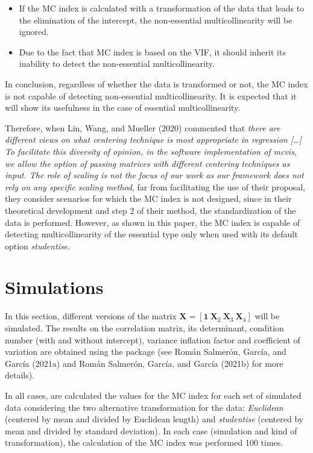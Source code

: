 \begin{itemize}
\tightlist
\item
  If the MC index is calculated with a transformation of the data that leads to the elimination of the intercept, the non-essential multicollinearity will be ignored.
\item
  Due to the fact that MC index is based on the VIF, it should inherit its inability to detect the non-essential multicollinearity.
\end{itemize}

In conclusion, regardless of whether the data is transformed or not, the MC index is not capable of detecting non-essential multicollinearity. It is expected that it will show its usefulness in the case of essential multicollinearity.

Therefore, when Lin, Wang, and Mueller (2020) commented that \emph{there are different views on what centering technique is most appropriate in regression {[}\ldots{]} To facilitate this diversity of opinion, in the software implementation of mcvis, we allow the option of passing matrices with different centering techniques as input. The role of scaling is not the focus of our work as our framework does not rely on any specific scaling method}, far from facilitating the use of their proposal, they consider scenarios for which the MC index is not designed, since in their theoretical development and step 2 of their method, the standardization of the data is performed. However, as shown in this paper, the MC index is capable of detecting multicollinearity of the essential type only when used with its default option \emph{studentise}.

\hypertarget{simulations}{%
\section{Simulations}\label{simulations}}

In this section, different versions of the matrix \(\mathbf{X} = [\mathbf{1} \ \mathbf{X}_{2} \ \mathbf{X}_{3} \ \mathbf{X}_{4}]\) will be simulated. The results on the correlation matrix, its determinant, condition number (with and without intercept), variance inflation factor and coefficient of variation are obtained using the  package (see Román Salmerón, García, and García (2021a) and Román Salmerón, García, and García (2021b) for more details).

In all cases, are calculated the values for the MC index for each set of simulated data considering the two alternative transformation for the data: \emph{Euclidean} (centered by mean and divided by Euclidean length) and \emph{studentise} (centered by mean and divided by standard deviation). In each case (simulation and kind of transformation), the calculation of the MC index was performed 100 times.

